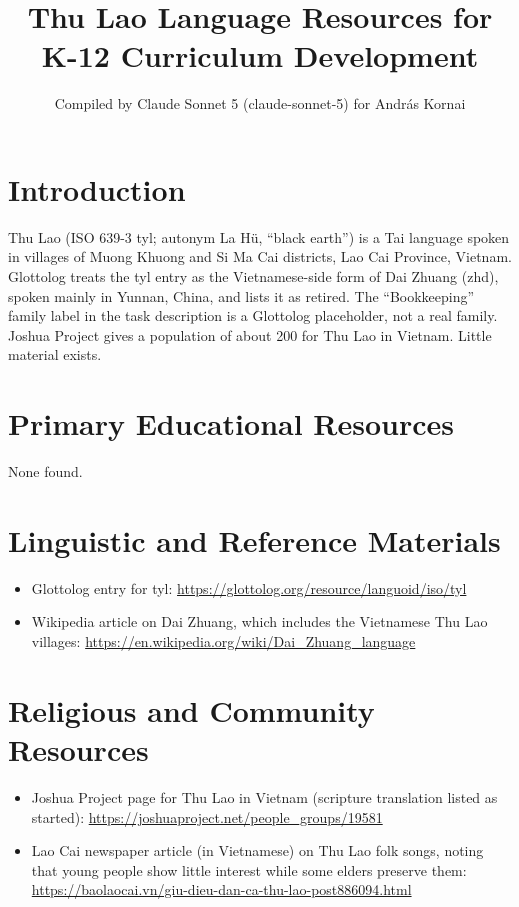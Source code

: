 \documentclass[12pt]{article}
\title{Thu Lao Language Resources for K-12 Curriculum Development}
\author{Compiled by Claude Sonnet 5 (claude-sonnet-5) for Andr\'as Kornai}
\date{}
\begin{document}
\maketitle

\section{Introduction}
Thu Lao (ISO 639-3 tyl; autonym La H\"u, ``black earth'') is a Tai language spoken in villages of Muong Khuong and Si Ma Cai districts, Lao Cai Province, Vietnam. Glottolog treats the tyl entry as the Vietnamese-side form of Dai Zhuang (zhd), spoken mainly in Yunnan, China, and lists it as retired. The ``Bookkeeping'' family label in the task description is a Glottolog placeholder, not a real family. Joshua Project gives a population of about 200 for Thu Lao in Vietnam. Little material exists.

\section{Primary Educational Resources}
None found.

\section{Linguistic and Reference Materials}
\begin{itemize}
\item Glottolog entry for tyl: \url{https://glottolog.org/resource/languoid/iso/tyl}
\item Wikipedia article on Dai Zhuang, which includes the Vietnamese Thu Lao villages: \url{https://en.wikipedia.org/wiki/Dai_Zhuang_language}
\end{itemize}

\section{Religious and Community Resources}
\begin{itemize}
\item Joshua Project page for Thu Lao in Vietnam (scripture translation listed as started): \url{https://joshuaproject.net/people_groups/19581}
\item Lao Cai newspaper article (in Vietnamese) on Thu Lao folk songs, noting that young people show little interest while some elders preserve them: \url{https://baolaocai.vn/giu-dieu-dan-ca-thu-lao-post886094.html}
\end{itemize}
\end{document}
